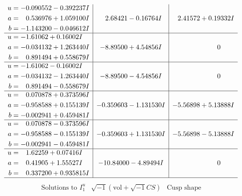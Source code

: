 \documentclass[1p]{elsarticle_modified}
\theoremstyle{definition}
\newcommand{\I}{\sqrt{-1}}
\begin{document}
$$\begin{array}{c|c|c}
\begin{aligned}
u &= -0.090552 - 0.392237 I \\
a &= \phantom{-}0.536976 + 1.059100 I \\
b &= -1.143200 - 0.046612 I\end{aligned}
 & \phantom{-}2.68421 - 0.16764 I & \phantom{-}2.41572 + 0.19332 I \\ \hline\begin{aligned}
u &= -1.61062 + 0.16002 I \\
a &= -0.034132 + 1.263440 I \\
b &= \phantom{-}0.891494 + 0.558679 I\end{aligned}
 & -8.89500 + 4.54856 I & \phantom{-0.000000 } 0 \\ \hline\begin{aligned}
u &= -1.61062 - 0.16002 I \\
a &= -0.034132 - 1.263440 I \\
b &= \phantom{-}0.891494 - 0.558679 I\end{aligned}
 & -8.89500 - 4.54856 I & \phantom{-0.000000 } 0 \\ \hline\begin{aligned}
u &= \phantom{-}0.070878 + 0.373596 I \\
a &= -0.958588 + 0.155139 I \\
b &= -0.002941 + 0.459481 I\end{aligned}
 & -0.359603 - 1.131530 I & -5.56898 + 5.13888 I \\ \hline\begin{aligned}
u &= \phantom{-}0.070878 - 0.373596 I \\
a &= -0.958588 - 0.155139 I \\
b &= -0.002941 - 0.459481 I\end{aligned}
 & -0.359603 + 1.131530 I & -5.56898 - 5.13888 I \\ \hline\begin{aligned}
u &= \phantom{-}1.62259 + 0.07416 I \\
a &= \phantom{-}0.41905 + 1.55527 I \\
b &= \phantom{-}0.337200 + 0.935815 I\end{aligned}
 & -10.84000 - 4.89494 I & \phantom{-0.000000 } 0\\
 \hline 
 \end{array}$$\newpage$$\begin{array}{c|c|c}  
\text{Solutions to }I^u_{1}& \I (\text{vol} + \sqrt{-1}CS) & \text{Cusp shape}\\
 \hline 
\begin{aligned}

\end{aligned}
\end{array}$$
\end{document}

